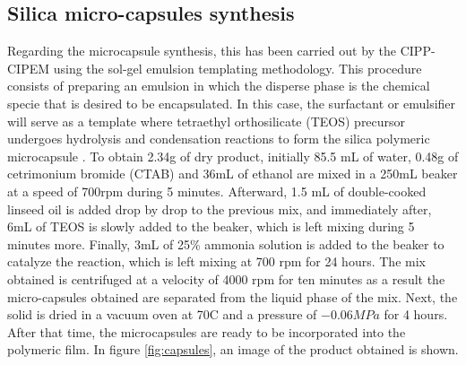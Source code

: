 \begin{refsection}
\subsection{Silica micro-capsules synthesis}\label{subsec:met.sintesis}
Regarding the microcapsule synthesis, this has been carried out by the CIPP-CIPEM using the sol-gel emulsion templating methodology. This procedure consists of preparing an emulsion in which the disperse phase is the chemical specie that is desired to be encapsulated. In this case, the surfactant or emulsifier will serve as a template where tetraethyl orthosilicate (TEOS) precursor undergoes hydrolysis and condensation reactions to form the silica polymeric microcapsule \cites{Alvarado2020ValidacionesEncapsulados}. To obtain 2.34g of dry product, initially 85.5 mL of water, 0.48g of cetrimonium bromide (CTAB) and 36mL of ethanol are mixed in a 250mL beaker at a speed of 700rpm during 5 minutes. Afterward, 1.5 mL of double-cooked linseed oil is added drop by drop to the previous mix, and immediately after, 6mL of TEOS is slowly added to the beaker, which is left mixing during 5 minutes more. Finally, 3mL of 25\% ammonia solution is added to the beaker to catalyze the reaction, which is left mixing at 700 rpm for 24 hours. The mix obtained is centrifuged at a velocity of 4000 rpm for ten minutes as a result the micro-capsules obtained are separated from the liquid phase of the mix. Next, the solid is dried in a vacuum oven at 70\degree C and a pressure of $-0.06 MPa$ for 4 hours. After that time, the microcapsules are ready to be incorporated into the polymeric film. In figure \ref{fig:capsules}, an image of the product obtained is shown. 



\end{refsection}
